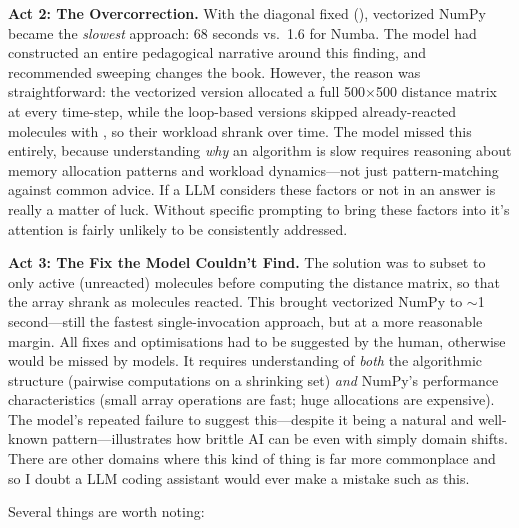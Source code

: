 \medskip
\noindent\textbf{Act 2: The Overcorrection.} With the diagonal fixed (), vectorized NumPy became the \emph{slowest} approach: 68 seconds vs.\ 1.6 for Numba. The model had constructed an entire pedagogical narrative around this finding, and recommended sweeping changes the book. However, the reason was straightforward: the vectorized version allocated a full 500$\times$500 distance matrix at every time-step, while the loop-based versions skipped already-reacted molecules with , so their workload shrank over time. The model missed this entirely, because understanding \emph{why} an algorithm is slow requires reasoning about memory allocation patterns and workload dynamics---not just pattern-matching against common advice. If a LLM considers these factors or not in an answer is really a matter of luck. Without specific prompting to bring these factors into it's attention is fairly unlikely to be consistently addressed.

\medskip
\noindent\textbf{Act 3: The Fix the Model Couldn't Find.} The solution was to subset to only active (unreacted) molecules before computing the distance matrix, so that the array shrank as molecules reacted. This brought vectorized NumPy to $\sim$1 second---still the fastest single-invocation approach, but at a more reasonable margin. All fixes and optimisations had to be suggested by the human, otherwise would be missed by models. It requires understanding of \emph{both} the algorithmic structure (pairwise computations on a shrinking set) \emph{and} NumPy's performance characteristics (small array operations are fast; huge allocations are expensive). The model's repeated failure to suggest this---despite it being a natural and well-known pattern---illustrates how brittle AI can be even with simply domain shifts. There are other domains where this kind of thing is far more commonplace and so I doubt a LLM coding assistant would ever make a mistake such as this.

\medskip
Several things are worth noting:


